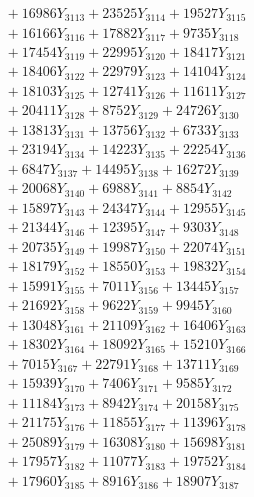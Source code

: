 \documentclass[a4paper,10pt]{article}
\begin{document}
{\begin{align}
&\;  + 16986 Y_{3113} + 23525 Y_{3114} + 19527 Y_{3115} \\[0.3ex]
&\;  + 16166 Y_{3116} + 17882 Y_{3117} + 9735 Y_{3118} \\[0.5ex]\allowbreak
&\;  + 17454 Y_{3119} + 22995 Y_{3120} + 18417 Y_{3121} \\[0.3ex]
&\;  + 18406 Y_{3122} + 22979 Y_{3123} + 14104 Y_{3124} \\[0.3ex]
&\;  + 18103 Y_{3125} + 12741 Y_{3126} + 11611 Y_{3127} \\[0.3ex]
&\;  + 20411 Y_{3128} + 8752 Y_{3129} + 24726 Y_{3130} \\[0.3ex]
&\;  + 13813 Y_{3131} + 13756 Y_{3132} + 6733 Y_{3133} \\[0.3ex]
&\;  + 23194 Y_{3134} + 14223 Y_{3135} + 22254 Y_{3136} \\[0.3ex]
&\;  + 6847 Y_{3137} + 14495 Y_{3138} + 16272 Y_{3139} \\[0.3ex]
&\;  + 20068 Y_{3140} + 6988 Y_{3141} + 8854 Y_{3142} \\[0.3ex]
&\;  + 15897 Y_{3143} + 24347 Y_{3144} + 12955 Y_{3145} \\[0.3ex]
&\;  + 21344 Y_{3146} + 12395 Y_{3147} + 9303 Y_{3148} \\[0.5ex]\allowbreak
&\;  + 20735 Y_{3149} + 19987 Y_{3150} + 22074 Y_{3151} \\[0.3ex]
&\;  + 18179 Y_{3152} + 18550 Y_{3153} + 19832 Y_{3154} \\[0.3ex]
&\;  + 15991 Y_{3155} + 7011 Y_{3156} + 13445 Y_{3157} \\[0.3ex]
&\;  + 21692 Y_{3158} + 9622 Y_{3159} + 9945 Y_{3160} \\[0.3ex]
&\;  + 13048 Y_{3161} + 21109 Y_{3162} + 16406 Y_{3163} \\[0.3ex]
&\;  + 18302 Y_{3164} + 18092 Y_{3165} + 15210 Y_{3166} \\[0.3ex]
&\;  + 7015 Y_{3167} + 22791 Y_{3168} + 13711 Y_{3169} \\[0.3ex]
&\;  + 15939 Y_{3170} + 7406 Y_{3171} + 9585 Y_{3172} \\[0.3ex]
&\;  + 11184 Y_{3173} + 8942 Y_{3174} + 20158 Y_{3175} \\[0.3ex]
&\;  + 21175 Y_{3176} + 11855 Y_{3177} + 11396 Y_{3178} \\[0.5ex]\allowbreak
&\;  + 25089 Y_{3179} + 16308 Y_{3180} + 15698 Y_{3181} \\[0.3ex]
&\;  + 17957 Y_{3182} + 11077 Y_{3183} + 19752 Y_{3184} \\[0.3ex]
&\;  + 17960 Y_{3185} + 8916 Y_{3186} + 18907 Y_{3187} \\[0.3ex]

\end{align}}
\end{document}
